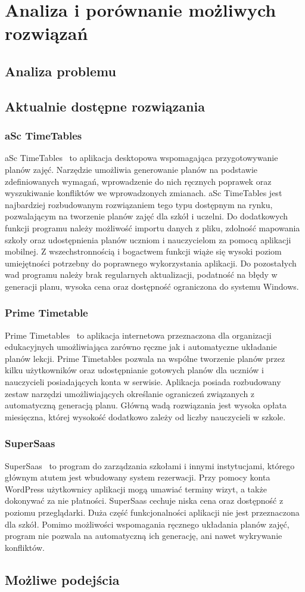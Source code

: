 
\chapter{Analiza i porównanie możliwych rozwiązań}
\section{Analiza problemu}
\section{Aktualnie dostępne rozwiązania}
\subsection{aSc TimeTables}
aSc TimeTables~\cite{asc} to aplikacja desktopowa wspomagająca przygotowywanie planów zajęć. Narzędzie umożliwia generowanie planów na podstawie zdefiniowanych wymagań, wprowadzenie do nich ręcznych poprawek oraz wyszukiwanie konfliktów we wprowadzonych zmianach. aSc TimeTables jest najbardziej rozbudowanym rozwiązaniem tego typu dostępnym na rynku, pozwalającym na tworzenie planów zajęć dla szkół i uczelni. Do dodatkowych funkcji programu należy możliwość importu danych z pliku, zdolność mapowania szkoły oraz udostępnienia planów uczniom i nauczycielom za pomocą aplikacji mobilnej. Z wszechstronnością i bogactwem funkcji wiąże się wysoki poziom umiejętności potrzebny do poprawnego wykorzystania aplikacji. Do pozostałych wad programu należy brak regularnych aktualizacji, podatność na błędy w generacji planu, wysoka cena oraz dostępność ograniczona do systemu Windows.
\subsection{Prime Timetable}
Prime Timetables~\cite{prime} to aplikacja internetowa przeznaczona dla organizacji edukacyjnych umożliwiająca zarówno ręczne jak i automatyczne układanie planów lekcji. Prime Timetables pozwala na wspólne tworzenie planów przez kilku użytkowników oraz udostępnianie gotowych planów dla uczniów i nauczycieli posiadających konta w serwisie. Aplikacja posiada rozbudowany zestaw narzędzi umożliwiających określanie ograniczeń związanych z automatyczną generacją planu. Główną wadą rozwiązania jest wysoka opłata miesięczna, której wysokość dodatkowo zależy od liczby nauczycieli w szkole. 
\subsection{SuperSaas}
SuperSaas~\cite{saas} to program do zarządzania szkołami i innymi instytucjami, którego głównym atutem jest wbudowany system rezerwacji. Przy pomocy konta WordPress użytkownicy aplikacji mogą umawiać terminy wizyt, a także dokonywać za nie płatności. SuperSaas cechuje niska cena oraz dostępność z poziomu przeglądarki. Duża część funkcjonalności aplikacji nie jest przeznaczona dla szkół. Pomimo możliwości wspomagania ręcznego układania planów zajęć, program nie pozwala na automatyczną ich generację, ani nawet wykrywanie konfliktów. 
\section{Możliwe podejścia}
